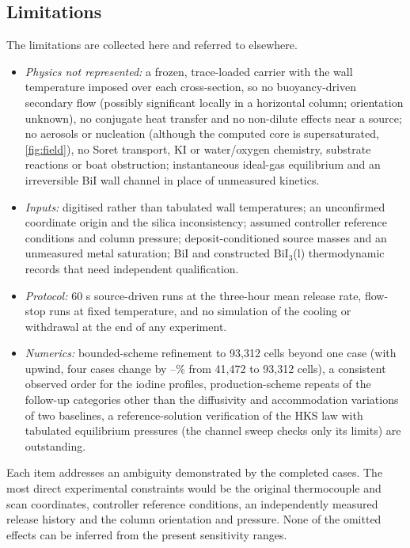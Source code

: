 \subsection{Limitations}
\label{sec:limitations}
The limitations are collected here and referred to elsewhere.
\begin{itemize}
\item \emph{Physics not represented:} a frozen, trace-loaded carrier
  with the wall temperature imposed over each cross-section, so no
  buoyancy-driven secondary flow (possibly significant locally in a
  horizontal column; orientation unknown), no conjugate heat transfer
  and no non-dilute effects near a source; no aerosols or nucleation
  (although the computed core is supersaturated, \cref{fig:field}),
  no Soret transport, KI or water/oxygen chemistry, substrate reactions or
  boat obstruction; instantaneous ideal-gas equilibrium and an
  irreversible BiI wall channel in place of unmeasured kinetics.
\item \emph{Inputs:} digitised rather than tabulated wall temperatures;
  an unconfirmed coordinate origin and the silica inconsistency;
  assumed controller reference conditions and column pressure;
  deposit-conditioned source masses and an unmeasured metal saturation;
  BiI and constructed BiI$_3$(l) thermodynamic records that need
  independent qualification.
\item \emph{Protocol:} 60 s source-driven runs at the three-hour mean
  release rate, flow-stop runs at fixed temperature, and no simulation
  of the cooling or withdrawal at the end of any experiment.
\item \emph{Numerics:} bounded-scheme refinement to 93,312 cells beyond
  one case (with upwind, four cases change by
  \SteelUpThree--\UpFourOthersMax\% from 41,472 to 93,312 cells),
  a consistent observed order for the iodine profiles, production-scheme
  repeats of the follow-up categories other than the diffusivity and
  accommodation variations of two baselines, a reference-solution
  verification of the HKS law with tabulated equilibrium pressures (the
  channel sweep checks only its limits) are outstanding.
\end{itemize}
Each item addresses an ambiguity demonstrated by the completed cases.
The most direct experimental constraints would be the original
thermocouple and scan coordinates, controller reference conditions, an
independently measured release history and the column orientation and
pressure. None of the omitted effects can be inferred from the present
sensitivity ranges.
